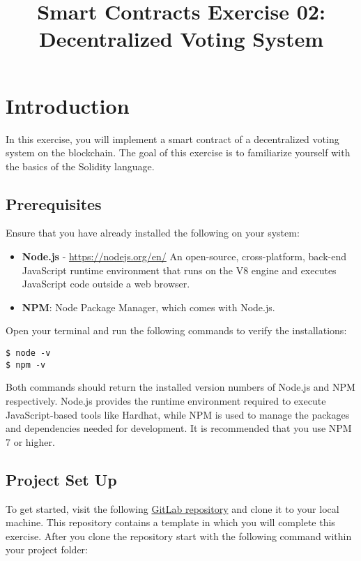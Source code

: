 \documentclass[12pt]{article}
\title{Smart Contracts Exercise 02: \\ Decentralized Voting System}
\author{}
\date{}
\begin{document}
\maketitle
\section{Introduction}

In this exercise, you will implement a smart contract of a decentralized voting system on the blockchain. The goal of this exercise is to familiarize yourself with the basics of the Solidity language.

\subsection{Prerequisites}

Ensure that you have already installed the following on your system:

\begin{itemize}
    \item \textbf{Node.js} - \url{https://nodejs.org/en/}
    An open-source, cross-platform, back-end JavaScript runtime environment that runs on the V8 engine and executes JavaScript code outside a web browser. 
    \item \textbf{NPM}: Node Package Manager, which comes with Node.js.
\end{itemize}

Open your terminal and run the following commands to verify the installations:

\begin{verbatim}
$ node -v
$ npm -v
\end{verbatim}

Both commands should return the installed version numbers of Node.js and NPM respectively. Node.js provides the runtime environment required to execute JavaScript-based tools like Hardhat, while NPM is used to manage the packages and dependencies needed for development. It is recommended that you use NPM 7 or higher.

\subsection{Project Set Up}

To get started, visit the following \href{https://gitlab.fel.cvut.cz/radovluk/smart-contracts-exercises/-/tree/main/02%20-%20Decentralized%20Voting%20System/task/task%20code}{GitLab repository} and clone it to your local machine. This repository contains a template in which you will complete this exercise. After you clone the repository start with the following command within your project folder:
\end{document}
